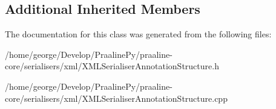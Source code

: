\subsection*{Additional Inherited Members}


The documentation for this class was generated from the following files\+:\begin{DoxyCompactItemize}
\item 
/home/george/\+Develop/\+Praaline\+Py/praaline-\/core/serialisers/xml/X\+M\+L\+Serialiser\+Annotation\+Structure.\+h\item 
/home/george/\+Develop/\+Praaline\+Py/praaline-\/core/serialisers/xml/X\+M\+L\+Serialiser\+Annotation\+Structure.\+cpp\end{DoxyCompactItemize}
